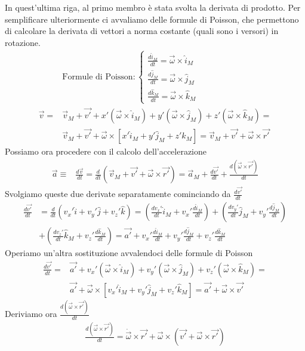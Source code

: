 \documentclass[10pt,a4paper]{article}
\begin{document}
In quest'ultima riga, al primo membro è stata svolta la derivata di prodotto. Per semplificare ulteriormente ci avvaliamo delle formule di Poisson, che permettono di calcolare la derivata di vettori a norma costante (quali sono i versori) in rotazione. 
\begin{align*}
	&\text{Formule di Poisson}:
	\begin{cases}
		\frac{d\hat{i}_M}{dt} = \vec{\omega} \times \hat{i}_M\\
		\frac{d\hat{j}_M}{dt} = \vec{\omega} \times \hat{j}_M\\
		\frac{d\hat{k}_M}{dt} = \vec{\omega} \times \hat{k}_M
	\end{cases}\\
\vec{v} =& \vec{v}_M + \vec{v'}+x'(\vec{\omega} \times \hat{i}_M) + y'(\vec{\omega} \times \hat{j}_M) + z'(\vec{\omega} \times \hat{k}_M) =\\
 &\vec{v}_M + \vec{v'}+\vec{\omega} \times [x'\hat{i}_M + y' \hat{j}_M + z'\hat{k}_M] = \vec{v}_M + \vec{v'} + \vec{\omega} \times \vec{r'}
\end{align*}
Possiamo ora procedere con il calcolo dell'accelerazione
\begin{align*}
	\vec{a} \equiv& \frac{d\vec{v}}{dt}= \frac{d}{dt}(\vec{v}_M+ \vec{v'} + \vec{\omega} \times \vec{r'})= \vec{a}_M + \frac{d\vec{v'}}{dt}+ \frac{d(\vec{\omega} \times \vec{r'})}{dt}
\end{align*}
Svolgiamo queste due derivate separatamente cominciando da $\frac{d\vec{v'}}{dt}$
\begin{align*}
	\frac{d\vec{v'}}{dt} &= \frac{d}{dt}(v_x' \hat{i}+v_y'\hat{j}+v_z'\hat{k}) = (\frac{dv_x'}{dt}\hat{i}_M + v_x'\frac{d\hat{i}_M}{dt}) + (\frac{dv_y'}{dt}\hat{j}_M + v_y'\frac{d\hat{j}_M}{dt})\\ &+(\frac{dv_z'}{dt}\hat{k}_M + v_z'\frac{d\hat{k}_M}{dt}) =  \vec{a'} +  v_x'\frac{d\hat{i}_M}{dt} + v_y'\frac{d\hat{j}_M}{dt} + v_z'\frac{d\hat{k}_M}{dt}
\end{align*}
Operiamo un'altra sostituzione avvalendoci delle formule di Poisson
\begin{align*}
		\frac{d\vec{v'}}{dt} =&\vec{a'} + v_x'(\vec{\omega} \times \hat{i}_M) + v_y'(\vec{\omega} \times \hat{j}_M) + v_z'(\vec{\omega} \times \hat{k}_M) =\\
	&\vec{a'}+\vec{\omega} \times [v_x'\hat{i}_M + v_y' \hat{j}_M + v_z'\hat{k}_M] = \vec{a'} + \vec{\omega} \times \vec{v'}
\end{align*}
Deriviamo ora $\frac{d(\vec{\omega} \times \vec{r'})}{dt}$
\begin{align*}
\frac{d(\vec{\omega} \times \vec{r'})}{dt} = \dot{\vec{\omega}}\times \vec{r'}+ \vec{\omega}\times (\vec{v'} + \vec{\omega}\times\vec{r'}) 
\end{align*}
\end{document}
